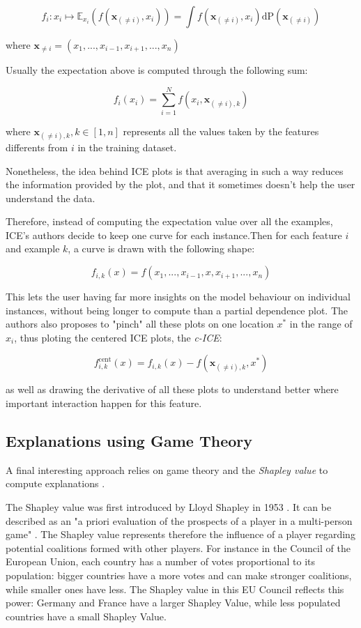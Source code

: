 \documentclass[a4paper,11pt]{kth-mag}
\begin{document}
\[
	f_i : x_i \mapsto \mathbb{E}_{x_i} (f(\mathbf{x}_{(\neq i)}, x_i)) = \int f(\mathbf{x}_{(\neq i)}, x_i) \mathrm{dP}(\mathbf{x}_{(\neq i)})
\]

where $\mathbf{x}_{\neq i} = (x_1, ..., x_{i-1}, x_{i+1}, ..., x_n)$

Usually the expectation above is computed through the following sum:

\[
	f_i(x_i) = \sum_{i=1}^{N} f(x_i, \mathbf{x}_{(\neq i),k})
\]

where $\mathbf{x}_{(\neq i),k}, k \in [1, n]$ represents all the values taken by the features differents from $i$ in the training dataset.

Nonetheless, the idea behind ICE plots is that averaging in such a way reduces the information provided by the plot, and that it sometimes doesn't help the user understand the data.

Therefore, instead of computing the expectation value over all the examples, ICE's authors decide to keep one curve for each instance.Then for each feature $i$ and example $k$, a curve is drawn with the following shape:

\[
	f_{i,k}(x) = f(x_1, ..., x_{i-1}, x, x_{i+1}, ..., x_n)
\]

This lets the user having far more insights on the model behaviour on individual instances, without being longer to compute than a partial dependence plot. The authors also proposes to "pinch" all these plots on one location $x^*$ in the range of $x_i$, thus ploting the centered ICE plots, the \textit{c-ICE}:

\[
	f^\mathrm{cent}_{i,k}(x) = f_{i,k}(x) - f(\mathbf{x}_{(\neq i),k}, x^*)
\]

as well as drawing the derivative of all these plots to understand better where important interaction happen for this feature.

\subsection{Explanations using Game Theory}

A final interesting approach relies on game theory and the \textit{Shapley value} to compute explanations \cite{gametheory}.

The Shapley value was first introduced by Lloyd Shapley in 1953 \cite{shapleyvalue}. It can be described as an "a priori evaluation of the prospects of a player in a multi-person game" \cite{hart1989shapley}. The Shapley value represents therefore the influence of a player regarding potential coalitions formed with other players. For instance in the Council of the European Union, each country has a number of votes proportional to its population: bigger countries have a more votes and can make stronger coalitions, while smaller ones have less. The Shapley value in this EU Council reflects this power: Germany and France have a larger Shapley Value, while less populated countries have a small Shapley Value. 
\end{document}
